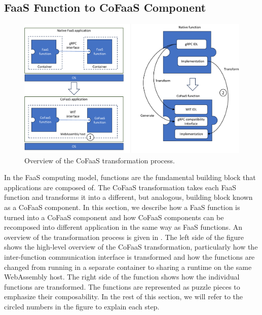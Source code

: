 \subsection{FaaS Function to CoFaaS Component}
\label{es:subsec:cofaascomp}

\begin{figure}
  \centering
  \includegraphics[width=\textwidth]{figures/components_overview}
  \caption{\label{es:fig:cofaas-transformation} Overview of the CoFaaS transformation process. }
\end{figure}

In the FaaS computing model, functions are the fundamental building block that applications are composed of. The CoFaaS transformation takes each FaaS function and transforms it into a different, but analogous, building block known as a CoFaaS component. In this section, we describe how a FaaS function is turned into a CoFaaS component and how CoFaaS components can be recomposed into different application in the same way as FaaS functions. An overview of the transformation process is given in . The left side of the figure shows the high-level overview of the CoFaaS transformation, particularly how the inter-function communication interface is transformed and how the functions are changed from running in a separate container to sharing a runtime on the same WebAssembly host. The right side of the function shows how the individual functions are transformed. The functions are represented as puzzle pieces to emphasize their composability. In the rest of this section, we will refer to the circled numbers in the figure to explain each step.


